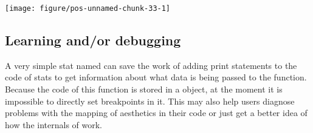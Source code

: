 \documentclass[paper=a4,10pt,div=17,headsepline,BCOR=12mm,twoside,open=right]{scrbook}\usepackage{knitr}
\begin{document}
\begin{knitrout}\footnotesize
{}\color{fgcolor}\begin{kframe}
\begin{alltt}
 \hlkwb{<-}  \hlopt{~}  \hlstd{,}  \hlstd{=} \hlstd{)}
    \hlopt{+}
  \hlstd{()} \hlopt{+}
  \hlstd{(} \hlstd{=} \hlstd{,}   \hlopt{+}
  \hlstd{(}\hlstd{(}   \hlstd{=} \hlstd{(}\hlopt{-}\hlstd{,} \hlstd{),}
                  \hlstd{=} \hlstd{)} \hlopt{+}
  \hlstd{()} \hlopt{+}
  \hlstd{(} \hlstd{=} \hlstd{)}
\end{alltt}
\end{kframe}

{\centering \texttt{[image: figure/pos-unnamed-chunk-33-1]} 

}



\end{knitrout}

\subsection{Learning and/or debugging}

A very simple stat named  can save the work of adding print statements to the code of stats to get information about what data is being passed to the  function. Because the code of this function is stored in a  object, at the moment it is impossible to directly set breakpoints in it. This  may also help users diagnose problems with the mapping of aesthetics in their code or just get a better idea of how the internals of \ggplot work.
\end{document}
